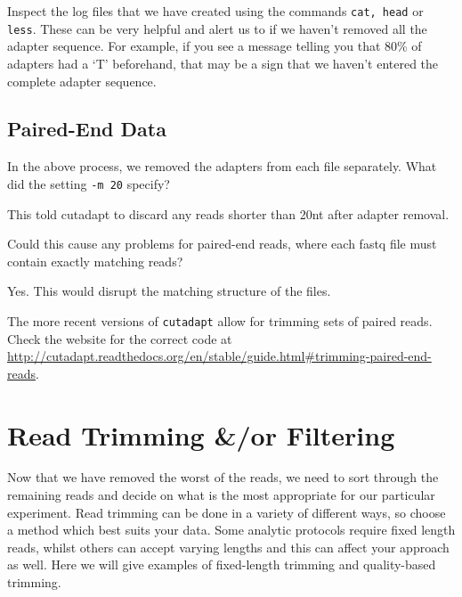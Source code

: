 \begin{steps}
Inspect the log files that we have created using the commands \texttt{cat, head} or \texttt{less}.
These can be very helpful and alert us to if we haven't removed all the adapter sequence.
For example, if you see a message telling you that 80\% of adapters had a `T' beforehand, that may be a sign that we haven't entered the complete adapter sequence.
\end{steps}

\subsection{Paired-End Data}
\begin{advanced}
\begin{questions}
In the above process, we removed the adapters from each file separately.
What did the setting \texttt{-m 20} specify?\\
\begin{answer}
This told cutadapt to discard any reads shorter than 20nt after adapter removal.
\end{answer}
Could this cause any problems for paired-end reads, where each fastq file must contain exactly matching reads?\\
\begin{answer}
Yes. This would disrupt the matching structure of the files.
\end{answer}
\end{questions}

The more recent versions of \texttt{cutadapt} allow for trimming sets of paired reads.
Check the website for the correct code at \url{http://cutadapt.readthedocs.org/en/stable/guide.html#trimming-paired-end-reads}.
\end{advanced}


\section{Read Trimming \&/or Filtering}
Now that we have removed the worst of the reads, we need to sort through the remaining reads and decide on what is the most appropriate for our particular experiment.
Read trimming can be done in a variety of different ways, so choose a method which best suits your data. 
Some analytic protocols require fixed length reads, whilst others can accept varying lengths and this can affect your approach as well.
Here we will give examples of fixed-length trimming and quality-based trimming.


